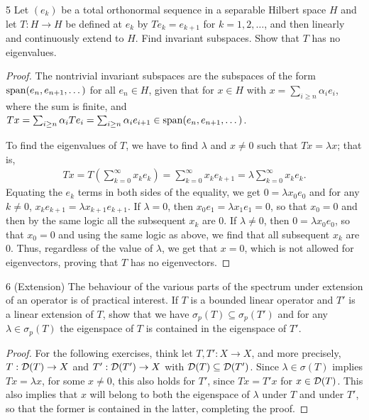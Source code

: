 \begin{exercise}{5}
Let $(e_k)$ be a total orthonormal sequence in a separable Hilbert space $H$ and let $T: H \to H$ be defined at $e_k$ by $T e_k = e_{k+1}$ for $k = 1, 2, \dots$, and then linearly and continuously extend to $H$.
Find invariant subspaces.
Show that $T$ has no eigenvalues.
\end{exercise}
\begin{proof}
The nontrivial invariant subspaces are the subspaces of the form $\operatorname*{span}(e_n, e_{n+1}, \dots)$ for all $e_n \in H$, given that for $x \in H$ with $x = \sum_{i \geq n} \alpha_i e_i$, where the sum is finite, and $T x = \sum_{i \geq n} \alpha_i T e_i = \sum_{i \geq n} \alpha_i e_{i+1} \in \operatorname*{span}(e_n, e_{n+1}, \dots)$.

To find the eigenvalues of $T$, we have to find $\lambda$ and $x \neq 0$ such that $T x = \lambda x$;
that is, 
\begin{align*}
    T x 
    = T( \sum_{k=0}^\infty x_k e_k)
    = \sum_{k=0}^\infty x_k e_{k+1}
    = \lambda \sum_{k=0}^\infty x_k e_k.
\end{align*}
Equating the $e_k$ terms in both sides of the equality, we get $0 = \lambda x_0 e_0$ and for any $k \neq 0$, $x_k e_{k+1} = \lambda x_{k+1} e_{k+1}$. 
If $\lambda = 0$, then $x_0 e_1 = \lambda x_1 e_1 = 0$, so that $x_0 = 0$ and then by the same logic all the subsequent $x_k$ are 0.
If $\lambda \neq 0$, then $0 = \lambda x_0 e_0$, so that $x_0 = 0$ and using the same logic as above, we find that all subsequent $x_k$ are 0.
Thus, regardless of the value of $\lambda$, we get that $x = 0$, which is not allowed for eigenvectors, proving that $T$ has no eigenvectors.
\end{proof} 

\begin{exercise}{6 (Extension)}
The behaviour of the various parts of the spectrum under extension of an operator is of practical interest.
If $T$ is a bounded linear operator and $T'$ is a linear extension of $T$, show that we have $\sigma_p(T) \subseteq \sigma_p(T')$ and for any $\lambda \in \sigma_p(T)$ the eigenspace of $T$ is contained in the eigenspace of $T'$.
\end{exercise}
\begin{proof}
For the following exercises, think let $T, T': X \to X$, and more precisely, $T: \mathcal{D}(T) \to X$ and $T': \mathcal{D}(T') \to X$ with $\mathcal{D}(T) \subseteq \mathcal{D}(T')$.
Since $\lambda \in \sigma(T)$ implies $Tx = \lambda x$, for some $x \neq 0$, this also holds for $T'$, since $T x = T' x$ for $x \in \mathcal{D}(T)$.
This also implies that $x$ will belong to both the eigenspace of $\lambda$ under $T$ and under $T'$, so that the former is contained in the latter, completing the proof.
\end{proof} 

